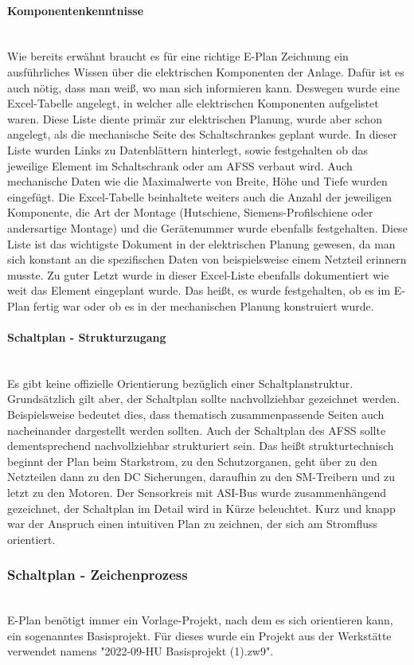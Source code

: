     \paragraph{Komponentenkenntnisse}\mbox{}\\
    Wie bereits erwähnt braucht es für eine richtige E-Plan Zeichnung ein ausführliches Wissen über die elektrischen Komponenten der Anlage. Dafür ist es auch nötig, dass man weiß, wo man sich informieren kann. Deswegen wurde eine Excel-Tabelle angelegt, in welcher alle elektrischen Komponenten aufgelistet waren. Diese Liste diente primär zur elektrischen Planung, wurde aber schon angelegt, als die mechanische Seite des Schaltschrankes geplant wurde. In dieser Liste wurden Links zu Datenblättern hinterlegt, sowie festgehalten ob das jeweilige Element im Schaltschrank oder am AFSS verbaut wird. Auch mechanische Daten wie die Maximalwerte von Breite, Höhe und Tiefe wurden eingefügt. Die Excel-Tabelle beinhaltete weiters auch die Anzahl der jeweiligen Komponente, die Art der Montage (Hutschiene, Siemens-Profilschiene oder andersartige Montage) und die Gerätenummer wurde ebenfalls festgehalten. Diese Liste ist das wichtigste Dokument in der elektrischen Planung gewesen, da man sich konstant an die spezifischen Daten von beispielsweise einem Netzteil erinnern musste. Zu guter Letzt wurde in dieser Excel-Liste ebenfalls dokumentiert wie weit das Element eingeplant wurde. Das heißt, es wurde festgehalten, ob es im E-Plan fertig war oder ob es in der mechanischen Planung konstruiert wurde.
    \paragraph{Schaltplan - Strukturzugang}\mbox{}\\
    Es gibt keine offizielle Orientierung bezüglich einer Schaltplanstruktur. Grundsätzlich gilt aber, der Schaltplan sollte nachvollziehbar gezeichnet werden. Beispielsweise bedeutet dies, dass thematisch zusammenpassende Seiten auch nacheinander dargestellt werden sollten. Auch der Schaltplan des AFSS sollte dementsprechend nachvollziehbar strukturiert sein. Das heißt strukturtechnisch beginnt der Plan beim Starkstrom, zu den Schutzorganen, geht über zu den Netzteilen dann zu den DC Sicherungen, daraufhin zu den SM-Treibern und zu letzt zu den Motoren. Der Sensorkreis mit ASI-Bus wurde zusammenhängend gezeichnet, der Schaltplan im Detail wird in Kürze beleuchtet. Kurz und knapp war der Anspruch einen intuitiven Plan zu zeichnen, der sich am Stromfluss orientiert. 
\subsubsection{Schaltplan - Zeichenprozess}\mbox{}\\
    E-Plan benötigt immer ein Vorlage-Projekt, nach dem es sich orientieren kann, ein sogenanntes Basisprojekt. Für dieses wurde ein Projekt aus der Werkstätte verwendet namens "2022-09-HU Basisprojekt (1).zw9".
